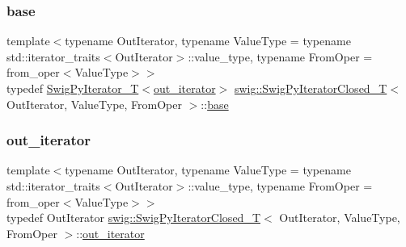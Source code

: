 \subsubsection{\texorpdfstring{base}{base}}
{\footnotesize\ttfamily template$<$typename Out\+Iterator, typename Value\+Type = typename std\+::iterator\+\_\+traits$<$\+Out\+Iterator$>$\+::value\+\_\+type, typename From\+Oper = from\+\_\+oper$<$\+Value\+Type$>$$>$ \\
typedef \hyperlink{classswig_1_1_swig_py_iterator___t}{Swig\+Py\+Iterator\+\_\+T}$<$\hyperlink{classswig_1_1_swig_py_iterator___t_aec35545038c3d804975a147253f061e4}{out\+\_\+iterator}$>$ \hyperlink{classswig_1_1_swig_py_iterator_closed___t}{swig\+::\+Swig\+Py\+Iterator\+Closed\+\_\+T}$<$ Out\+Iterator, Value\+Type, From\+Oper $>$\+::\hyperlink{classswig_1_1_swig_py_iterator_closed___t_a7a4e72c91ddb0aa9a92484d20c260ee8}{base}}

\mbox{\label{classswig_1_1_swig_py_iterator_closed___t_ad1905c1ed0b2c2cb975788b82df5dba7}} 
\subsubsection{\texorpdfstring{out\+\_\+iterator}{out\_iterator}}
{\footnotesize\ttfamily template$<$typename Out\+Iterator, typename Value\+Type = typename std\+::iterator\+\_\+traits$<$\+Out\+Iterator$>$\+::value\+\_\+type, typename From\+Oper = from\+\_\+oper$<$\+Value\+Type$>$$>$ \\
typedef Out\+Iterator \hyperlink{classswig_1_1_swig_py_iterator_closed___t}{swig\+::\+Swig\+Py\+Iterator\+Closed\+\_\+T}$<$ Out\+Iterator, Value\+Type, From\+Oper $>$\+::\hyperlink{classswig_1_1_swig_py_iterator___t_aec35545038c3d804975a147253f061e4}{out\+\_\+iterator}}

\mbox{\label{classswig_1_1_swig_py_iterator_closed___t_a37a58d5b5c7a26f9345246d781e7edd4}} 
